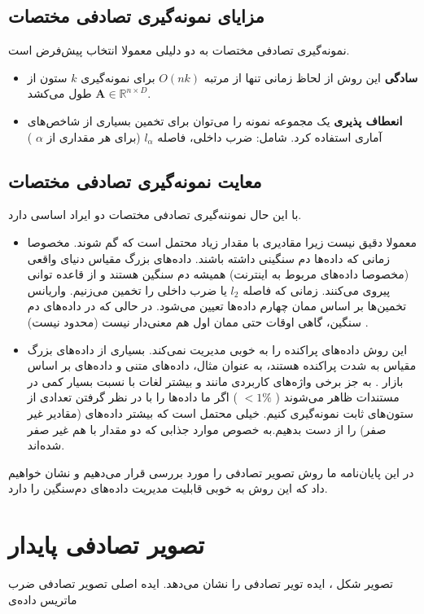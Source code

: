 \subsection{مزایای نمونه‌گیری تصادفی مختصات}
نمونه‌گیری تصادفی مختصات به دو دلیلی معمولا انتخاب پیش‌فرض است.

\begin{itemize}
\item
\textbf{سادگی}
این روش از لحاظ زمانی تنها از مرتبه 
$O(nk)$
برای نمونه‌گیری 
$k$ 
ستون از 
$\mathbf{A} \in \mathbb{R}^{n \times D}$
طول می‌کشد.
\item
\textbf{انعطاف پذیری}
یک مجموعه نمونه را می‌توان برای تخمین بسیاری از شاخص‌های آماری استفاده کرد. شامل: ضرب داخلی، فاصله
$l_\alpha$
(برای هر مقداری از 
$\alpha$
)
\end{itemize}

\subsection{معایت نمونه‌گیری تصادفی مختصات}
با این حال نموننه‌گیری تصادفی مختصات دو ایراد اساسی دارد.
\begin{itemize}
\item
معمولا دقیق نیست زیرا مقادیری با مقدار زیاد محتمل است که گم شوند. مخصوصا زمانی که داده‌ها دم سنگینی داشته باشند. داده‌های بزرگ مقیاس دنیای واقعی (مخصوصا داده‌های مربوط به اینترنت) همیشه دم  سنگین هستند و از قاعده توانی پیروی می‌کنند.
\cite{litez142,litez66, litez53, litez111}
زمانی که فاصله 
$l_2$
یا ضرب داخلی را تخمین می‌زنیم. واریانس تخمین‌ها بر اساس ممان چهارم داده‌ها تعیین می‌شود. در حالی که در داده‌های دم سنگین، گاهی اوقات حتی ممان اول هم معنی‌دار نیست (محدود نیست)
\cite{litez142}
.
\item
این روش داده‌های پراکنده را به خوبی مدیریت نمی‌کند. بسیاری از داده‌های بزرگ مقیاس به شدت پراکنده هستند، به عنوان مثال، داده‌های متنی 
\cite{litez60}
و داده‌های بر اساس بازار
\cite{litez7, litez158}
. به جز برخی واژه‌های کاربردی مانند 
 و 
بیشتر لغات با نسبت بسیار کمی در مستندات ظاهر می‌شوند (
$<1\%$
)
اگر ما داده‌ها را با در نظر گرفتن تعدادی از ستون‌های ثابت نمونه‌گیری کنیم. خیلی محتمل است که بیشتر داده‌های (مقادیر غیر صفر) را از دست بدهیم.به خصوص موارد جذابی که دو مقدار با هم غیر صفر شده‌اند.
\end{itemize}
در این پایان‌نامه ما روش تصویر تصادفی را مورد بررسی قرار می‌دهیم و نشان خواهیم داد که این روش به خوبی قابلیت مدیریت داده‌های دم‌سنگین را دارد.

\section{تصویر تصادفی پایدار}
تصویر شکل
، ایده تویر تصادفی را نشان می‌دهد. ایده اصلی تصویر تصادفی ضرب ماتریس داده‌ی 


